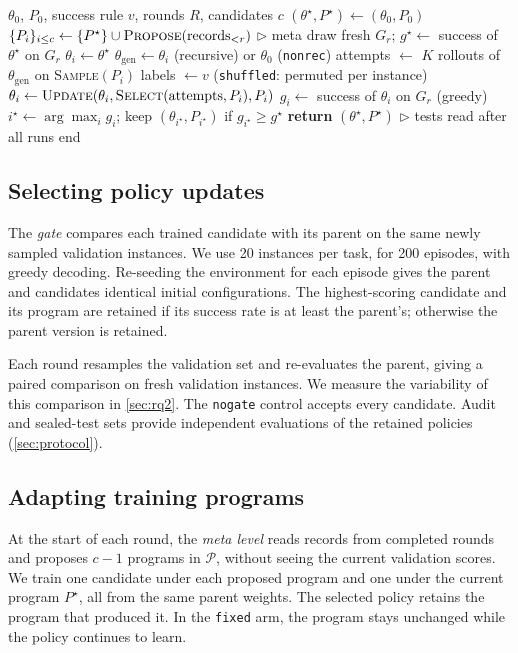 \begin{algorithm}[t]
\caption{Gated recursive self-improvement}
\label{alg:loop}
\begin{algorithmic}[1]
\REQUIRE $\theta_0$, $P_0$, success rule $v$, rounds $R$, candidates $c$
\STATE $(\theta^\star, P^\star) \leftarrow (\theta_0, P_0)$
  \STATE $\{P_i\}_{i \le c} \leftarrow \{P^\star\} \cup \textsc{Propose}(\text{records}_{<r})$ \hfill $\triangleright$ meta
  \STATE draw fresh $G_r$; $g^\star \leftarrow$ success of $\theta^\star$ on $G_r$
     \STATE $\theta_i \leftarrow \theta^\star$
        \STATE $\theta_{\text{gen}} \leftarrow \theta_i$ (recursive) or $\theta_0$ (\texttt{nonrec})
        \STATE attempts $\leftarrow$ $K$ rollouts of $\theta_{\text{gen}}$ on \textsc{Sample}$(P_i)$
        \STATE labels $\leftarrow v$ (\texttt{shuffled}: permuted per instance)
        \STATE $\theta_i \leftarrow \textsc{Update}(\theta_i, \textsc{Select}(\text{attempts}, P_i), P_i)$
     \ENDFOR
     \STATE $g_i \leftarrow$ success of $\theta_i$ on $G_r$ (greedy)
  \ENDFOR
  \STATE $i^\star \leftarrow \arg\max_i g_i$; keep $(\theta_{i^\star}, P_{i^\star})$ if $g_{i^\star} \ge g^\star$
\ENDFOR
\STATE \textbf{return} $(\theta^\star, P^\star)$ \hfill $\triangleright$ tests read after all runs end
\end{algorithmic}
\end{algorithm}

\subsection{Selecting policy updates}
\label{sec:selection}
The \emph{gate} compares each trained candidate with its parent on the same newly sampled validation instances. We use 20 instances per task, for 200 episodes, with greedy decoding. Re-seeding the environment for each episode gives the parent and candidates identical initial configurations. The highest-scoring candidate and its program are retained if its success rate is at least the parent's; otherwise the parent version is retained.

Each round resamples the validation set and re-evaluates the parent, giving a paired comparison on fresh validation instances. We measure the variability of this comparison in \cref{sec:rq2}. The \texttt{nogate} control accepts every candidate. Audit and sealed-test sets provide independent evaluations of the retained policies (\cref{sec:protocol}).

\subsection{Adapting training programs}
\label{sec:meta}
At the start of each round, the \emph{meta level} reads records from completed rounds and proposes $c{-}1$ programs in $\mathcal{P}$, without seeing the current validation scores. We train one candidate under each proposed program and one under the current program $P^\star$, all from the same parent weights. The selected policy retains the program that produced it. In the \texttt{fixed} arm, the program stays unchanged while the policy continues to learn.

